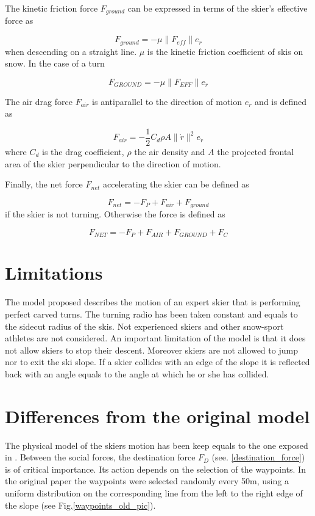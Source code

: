 \documentclass[12pt,a4paper,twoside]{book}
\newcommand{\norm}[1]{\lVert#1\rVert}
\begin{document}
The kinetic friction force $F_{ground}$ can be expressed in terms of the skier's effective force as

\begin{equation}
F_{ground}=-\mu \norm{F_{eff}}e_{\dot{r}}
\end{equation}
when descending on a straight line. $\mu$ is the kinetic friction coefficient of skis on snow. In the case of a turn

\begin{equation}
F_{GROUND}=-\mu \norm{F_{EFF}}e_{\dot{r}}
\end{equation}

The air drag force $F_{air}$ is antiparallel to the direction of motion $e_{\dot{r}}$ and is defined as

\begin{equation}
F_{air}=-\frac{1}{2}C_d \rho A \norm{\dot{r}}^2 e_{\dot{r}}
\end{equation}
where $C_d$ is the drag coefficient, $\rho$ the air density and $A$ the projected frontal area of the skier perpendicular to the direction of motion.

Finally, the net force $F_{net}$ accelerating the skier can be defined as

\begin{equation}
F_{net}=-F_P + F_{air} + F_{ground}
\end{equation}
if the skier is not turning. Otherwise the force is defined as

\begin{equation}
F_{NET}=-F_P + F_{AIR} + F_{GROUND} + F_C
\end{equation}

\section{Limitations}
The model proposed describes the motion of an expert skier that is performing perfect carved turns. The turning radio has been taken constant and equals to the sidecut radius of the skis. Not experienced skiers and other snow-sport athletes are not considered. An important limitation of the model is that it does not allow skiers to stop their descent.  Moreover skiers are not allowed to jump nor to exit the ski slope. If a skier collides with an edge of the slope it is reflected back with an angle equals to the angle at which he or she has collided.

\section{Differences from the original model}
The physical model of the skiers motion has been keep equals to the one exposed in \cite{hol2012}. Between the social forces, the destination force $F_D$ (see. \ref{destination_force}) is of critical importance. Its action depends on the selection of the waypoints. In the original paper the waypoints were selected randomly every 50m, using a uniform distribution on the corresponding line from the left to the right edge of the slope (see Fig.\ref{waypoints_old_pic}).
\end{document}
